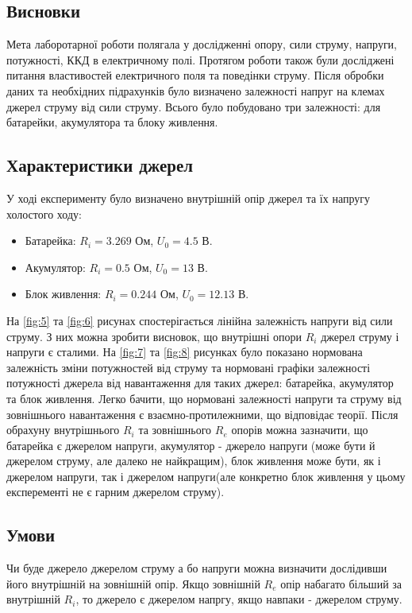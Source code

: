 \documentclass[a4paper,12pt]{article}
\begin{document}
\begin{justify}
	\subsection{Висновки}	
	Мета лаборотарної роботи полягала у дослідженні опору, сили струму, напруги, потужності, ККД в електричному полі. Протягом роботи також були досліджені питання властивостей електричного поля та поведінки струму. Після обробки даних та необхідних підрахунків було визначено залежності напруг на клемах джерел струму від сили струму. Всього було побудовано три залежності: для батарейки, акумулятора та блоку живлення. 
	\subsection{Характеристики джерел}
	У ході експерименту було визначено внутрішній опір джерел та їх напругу холостого ходу:
	\begin{itemize}
		\item Батарейка: $R_i=3.269$ Ом, $U_0=4.5$ В.
		\item Акумулятор: $R_i=0.5$ Ом, $U_0=13$ В.
		\item Блок живлення: $R_i=0.244$ Ом, $U_0=12.13$ В.
	\end{itemize} 
	На \ref{fig:5} та \ref{fig:6} рисунах спостерігається лінійна залежність напруги від сили струму. З них можна зробити висновок, що  внутрішні опори $R_i$ джерел струму і напруги є сталими. 
	На \ref{fig:7} та \ref{fig:8} рисунках було показано нормована залежність зміни потужностей від струму та нормовані графіки залежності потужності джерела від навантаження для таких джерел: батарейка, акумулятор та блок живлення. Легко бачити, що нормовані залежності напруги та струму від зовнішнього навантаження є взаємно-протилежними, що відповідає теорії. Після обрахуну внутрішнього $R_i$ та зовнішнього $R_e$ опорів можна зазначити, що батарейка є джерелом напруги, акумулятор - джерело напруги (може бути й джерелом струму, але далеко не найкращим), блок живлення може бути, як і джерелом напруги, так і джерелом напруги(але конкретно блок живлення у цьому експеременті не є гарним джерелом струму). 
	\subsection{Умови}
	Чи буде джерело джерелом струму а бо напруги можна визначити дослідивши його внутрішній на зовнішній опір. Якщо зовнішній $R_e$ опір набагато більший за внутрішній $R_i$, то джерело є джерелом напргу, якщо навпаки - джерелом струму.
	
\end{justify}
\end{document}
